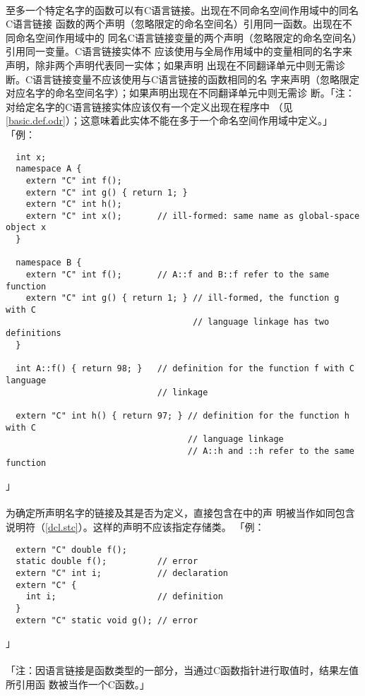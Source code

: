\paragraph{}
至多一个特定名字的函数可以有C语言链接。出现在不同命名空间作用域中的同名C语言链接
函数的两个声明（忽略限定的命名空间名）引用同一函数。出现在不同命名空间作用域中的
同名C语言链接变量的两个声明（忽略限定的命名空间名）引用同一变量。C语言链接实体不
应该使用与全局作用域中的变量相同的名字来声明，除非两个声明代表同一实体；如果声明
出现在不同翻译单元中则无需诊断。C语言链接变量不应该使用与C语言链接的函数相同的名
字来声明（忽略限定对应名字的命名空间名字）；如果声明出现在不同翻译单元中则无需诊
断。「注：对给定名字的C语言链接实体应该仅有一个定义出现在程序中
（见\ref{basic.def.odr}）；这意味着此实体不能在多于一个命名空间作用域中定义。」
「例：
\begin{lstlisting}
  int x;
  namespace A {
    extern "C" int f();
    extern "C" int g() { return 1; }
    extern "C" int h();
    extern "C" int x();       // ill-formed: same name as global-space object x
  }

  namespace B {
    extern "C" int f();       // A::f and B::f refer to the same function
    extern "C" int g() { return 1; } // ill-formed, the function g with C
                                     // language linkage has two definitions
  }

  int A::f() { return 98; }   // definition for the function f with C language
                              // linkage

  extern "C" int h() { return 97; } // definition for the function h with C
                                    // language linkage
                                    // A::h and ::h refer to the same function
\end{lstlisting}」

\paragraph{}
为确定所声明名字的链接及其是否为定义，直接包含在中的声
明被当作如同包含说明符（\ref{dcl.stc}）。这样的声明不应该指定存储类。
「例：
\begin{lstlisting}
  extern "C" double f();
  static double f();          // error
  extern "C" int i;           // declaration
  extern "C" {
    int i;                    // definition
  }
  extern "C" static void g(); // error
\end{lstlisting}」

\paragraph{}
「注：因语言链接是函数类型的一部分，当通过C函数指针进行取值时，结果左值所引用函
数被当作一个C函数。」

